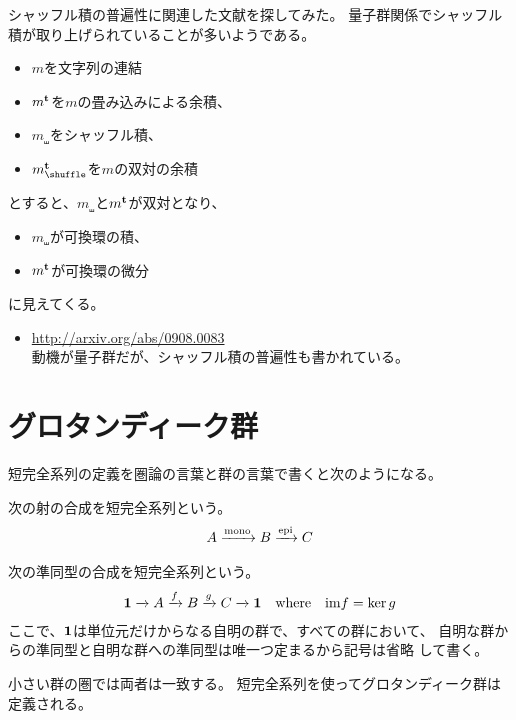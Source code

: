 	\begin{note}[シャッフル積の普遍性]\label{note:シャッフル積の普遍性} %
		シャッフル積の普遍性に関連した文献を探してみた。
		量子群関係でシャッフル積が取り上げられていることが多いようである。
		\begin{itemize}\setlength{\itemsep}{-1mm} %
			\item $m$を文字列の連結
			\item $m^{\mathbf{t}}$を$m$の畳み込みによる余積、
			\item $m_\shuffle$をシャッフル積、
			\item $m_\shuffle^\tran$を$m$の双対の余積
		\end{itemize} %
		とすると、$m_\shuffle$と$m^{\mathbf{t}}$が双対となり、
		\begin{itemize}\setlength{\itemsep}{-1mm} %
			\item $m_\shuffle$が可換環の積、
			\item $m^{\mathbf{t}}$が可換環の微分
		\end{itemize} %
		に見えてくる。
		\begin{itemize}\setlength{\itemsep}{-1mm} %
			\item \url{http://arxiv.org/abs/0908.0083} \\
			動機が量子群だが、シャッフル積の普遍性も書かれている。
		\end{itemize} %
	\end{note} %
\section{グロタンディーク群}\label{s1:グロタンディーク群} %
	短完全系列の定義を圏論の言葉と群の言葉で書くと次のようになる。
	\begin{description}\setlength{\itemsep}{-1mm} %
		\item[圏の言葉] 次の射の合成を短完全系列という。
		\begin{equation*}\begin{split}
			A \xrightarrow[{}]{{\operatorname{mono}}} B \xrightarrow[{}]{{\operatorname{epi}}} C
		\end{split}\end{equation*}
		\item[群の言葉] 次の準同型の合成を短完全系列という。
		\begin{equation*}\begin{split}
			{\ensuremath{\mathbf{1}}} \xrightarrow[{}]{} A \xrightarrow[{}]{f} B \xrightarrow[{}]{g} C \xrightarrow[{}]{} {\mathbf{1}}
			\quad\text{where}\quad {\ensuremath{\operatorname{im}}} f = \ker g
		\end{split}\end{equation*}
		ここで、${\mathbf{1}}$は単位元だけからなる自明の群で、すべての群において、
		自明な群からの準同型と自明な群への準同型は唯一つ定まるから記号は省略
		して書く。
	\end{description} %
	小さい群の圏では両者は一致する。
	短完全系列を使ってグロタンディーク群は定義される。

